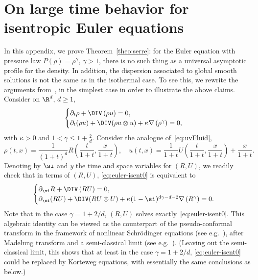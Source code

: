 \appendix
\section{On large time behavior for isentropic Euler equations}\label{sec:serre}

In this appendix, we prove Theorem~\ref{theo:serre}: for the Euler equation with pressure law $P(\rho)=\rho^{\gamma}$, $\gamma>1$, there is no such thing as a universal asymptotic profile for the density. In addition, the dispersion associated to global smooth solutions is not the same as in the isothermal case. To see this, we rewrite the arguments from~\cite{Serre97}, in the simplest case in order to illustrate the above claims. Consider on $\R^d$, $d\ge 1$,
\begin{equation}\label{eq:euler-isent0}
\begin{cases}
\partial_t \rho+\DIV\left(\rho u\right)=0,\\
\partial_t (\rho u) +\DIV(\rho u\otimes u)+\kappa\nabla
\left(\rho^\gamma\right)= 0,
\end{cases}
\end{equation}
with $\kappa>0$ and $1<\gamma\le 1+\frac{2}{d}$. Consider the analogue of~\eqref{eq:uvFluid},
\begin{equation*}
\rho(t,x) = \frac{1}{(1+t)^d}R\left(\frac{t}{1+t},\frac{x}{1+t}\right),\quad u(t,x) = \frac{1}{1+t}U\left(\frac{t}{1+t},\frac{x}{1+t}\right) +\frac{x}{1+t}.
\end{equation*}
Denoting by $\si$ and $y$ the time and space variables for $(R,U)$, we readily check that in terms of $(R,U)$, \eqref{eq:euler-isent0} is equivalent to
\begin{equation}\label{eq:euler-isent2}
\begin{cases}
\partial_\si R+\DIV\left(RU\right)=0,\\
\partial_\si (RU) +\DIV(R U\otimes U)+\kappa(1-\si)^{d\gamma-d-2}\nabla
\left(R^\gamma\right)= 0.
\end{cases}
\end{equation}
Note that in the case $\gamma=1+2/d$, $(R,U)$ solves exactly~\eqref{eq:euler-isent0}. This algebraic identity can be viewed as the counterpart of the pseudo-conformal transform in the framework of nonlinear Schr\"odinger equations (see e.g.~\cite{CazCourant}), after Madelung transform and a semi-classical limit (see e.g.~\cite{AnMa09,AnMa12,CaDaSa12}). (Leaving out the semi-classical limit, this shows that at least in the case $\gamma=1+2/d$, \eqref{eq:euler-isent0} could be replaced by Korteweg equations, with essentially the same conclusions as below.)

